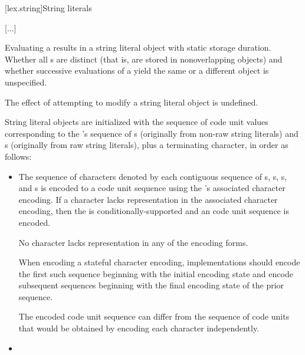 \documentclass{wg21}
\newcommand{\replaceucs}{\changed{UCS}{Unicode}}
\begin{document}
[lex.string]{String literals}

\textcolor{noteclr}{[...]}


\pnum
Evaluating a  results in a string literal object
with static storage duration.
%
Whether all s are distinct (that is, are stored in
nonoverlapping objects) and whether successive evaluations of a
 yield the same or a different object is
unspecified.
\begin{note}
    The effect of attempting to modify a string literal object is undefined.
\end{note}

\pnum
{}%
%
%
String literal objects are initialized with
the sequence of code unit values
corresponding to the 's sequence of
s (originally from non-raw string literals) and
s (originally from raw string literals),
plus a terminating  character,
in order as follows:
\begin{itemize}
    \item
    The sequence of characters denoted by each contiguous sequence of
    s,
    s,
    s, and
    s
    is encoded to a code unit sequence
    using the 's associated character encoding.
    If a character lacks representation in the associated character encoding,
    then the  is conditionally-supported and
    an
    code unit sequence is encoded.
    \begin{note}
        No character lacks representation in any of the \replaceucs{} encoding forms.
    \end{note}
    When encoding a stateful character encoding,
    implementations should encode the first such sequence
    beginning with the initial encoding state and
    encode subsequent sequences
    beginning with the final encoding state of the prior sequence.
    \begin{note}
        The encoded code unit sequence can differ from
        the sequence of code units that would be obtained by
        encoding each character independently.
    \end{note}
    \item
\end{itemize}
\end{document}
